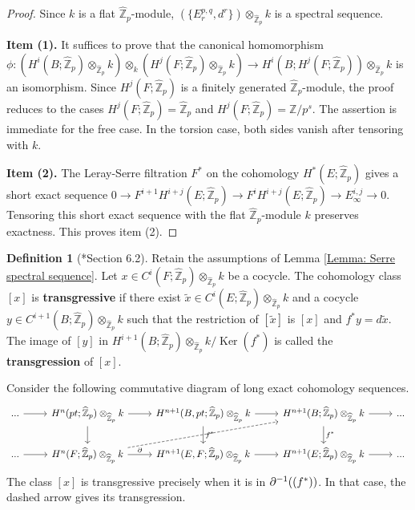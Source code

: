 \documentclass[11pt]{amsart}
\theoremstyle{definition}
\newtheorem{definition}[theorem]{Definition}
\numberwithin{equation}{section}
\numberwithin{equation}{section}
\newcommand\ZZ{\mathbb{Z}}
\let\Im\relax
\DeclareMathOperator{\Im}{Im}
\DeclareMathOperator{\Ker}{Ker}
\let\Im\relax
\DeclareMathOperator{\Im}{Im}
\begin{document}
\begin{proof}
Since $k$ is a flat $\widehat{\ZZ}_p$-module, $(\{E^{p,q}_r,d^r\})\otimes_{\widehat{\ZZ}_p} k$ is a spectral sequence. 

\textbf{Item (1).} It suffices to prove that the canonical homomorphism $\phi:(H^i(B;\widehat{\ZZ}_p)\otimes_{\widehat{\ZZ}_p} k)\otimes_{k} (H^j(F;\widehat{\ZZ}_p)\otimes_{\widehat{\ZZ}_p} k)\rightarrow H^i(B;H^j(F;\widehat{\ZZ}_p))\otimes_{\widehat{\ZZ}_p} k$ is an isomorphism.
Since $H^j(F;\widehat{\ZZ}_p)$ is a finitely generated $\widehat{\ZZ}_p$-module, the proof reduces to the cases $H^j(F;\widehat{\ZZ}_p)=\widehat{\ZZ}_p$ and $H^j(F;\widehat{\ZZ}_p)=\ZZ/p^s$. The assertion is immediate for the free case. In the torsion case, both sides vanish after tensoring with $k$.

\textbf{Item (2).} The Leray-Serre filtration $F^*$ on the cohomology $H^*(E;\widehat{\ZZ}_p)$ gives a short exact sequence $0\rightarrow F^{i+1}H^{i+j}(E;\widehat{\ZZ}_p)\rightarrow F^{i}H^{i+j}(E;\widehat{\ZZ}_p)\rightarrow E^{i,j}_{\infty}\rightarrow 0$.
Tensoring this short exact sequence with the flat $\widehat{\ZZ}_p$-module $k$ preserves exactness. This proves item (2).
\end{proof}

\begin{definition}[\cite{McCleary-spectral-sequence}*{Section 6.2}]\label{Def: Transgression}
Retain the assumptions of Lemma \ref{Lemma: Serre spectral sequence}. Let $x\in C^i(F;\widehat{\ZZ}_p)\otimes_{\widehat{\ZZ}_p} k$ be a cocycle. The cohomology class $[x]$ is \textbf{transgressive} if there exist  $\widetilde{x}\in C^i(E;\widehat{\ZZ}_p)\otimes_{\widehat{\ZZ}_p} k$ and a cocycle $y\in C^{i+1}(B;\widehat{\ZZ}_p)\otimes_{\widehat{\ZZ}_p} k$ such that the restriction of $[\widetilde{x}]$ is $[x]$ and $f^*y=d\widetilde{x}$. The image of $[y]$ in $H^{i+1}(B;\widehat{\ZZ}_p)\otimes_{\widehat{\ZZ}_p} k/\Ker(f^*)$ is called the \textbf{transgression} of $[x]$.
\end{definition}

Consider the following commutative diagram of long exact cohomology sequences.
\[
\begin{tikzcd}
    ... \arrow[r] & H^n(pt;\widehat{\ZZ}_p)\otimes_{\widehat{\ZZ}_p} k \arrow[r] \arrow[d] & H^{n+1}(B,pt;\widehat{\ZZ}_p)\otimes_{\widehat{\ZZ}_p} k \arrow[r] \arrow[d,"f^*"] & H^{n+1}(B;\widehat{\ZZ}_p)\otimes_{\widehat{\ZZ}_p} k \arrow[r] \arrow[d,"f^*"] & ... \\
    ... \arrow[r] & H^n(F;\widehat{\ZZ}_p)\otimes_{\widehat{\ZZ}_p} k \arrow[r,"\partial"] \arrow[rru,dashed] & H^{n+1}(E,F;\widehat{\ZZ}_p)\otimes_{\widehat{\ZZ}_p} k \arrow[r] & H^{n+1}(E;\widehat{\ZZ}_p)\otimes_{\widehat{\ZZ}_p} k \arrow[r] & ...
\end{tikzcd}
\]
The class $[x]$ is transgressive precisely when it is in $\partial^{-1}(\Im(f^*))$. In that case, the dashed arrow gives its transgression.
\end{document}
